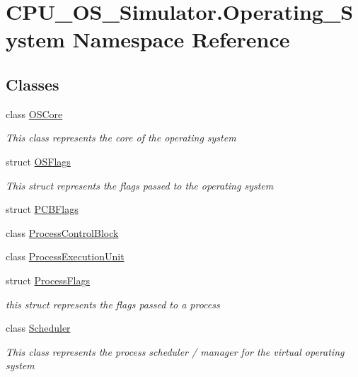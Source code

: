 \hypertarget{namespace_c_p_u___o_s___simulator_1_1_operating___system}{}\section{C\+P\+U\+\_\+\+O\+S\+\_\+\+Simulator.\+Operating\+\_\+\+System Namespace Reference}
\label{namespace_c_p_u___o_s___simulator_1_1_operating___system}
\subsection*{Classes}
\begin{DoxyCompactItemize}
\item 
class \hyperlink{class_c_p_u___o_s___simulator_1_1_operating___system_1_1_o_s_core}{O\+S\+Core}
\begin{DoxyCompactList}\small\item\em This class represents the core of the operating system \end{DoxyCompactList}\item 
struct \hyperlink{struct_c_p_u___o_s___simulator_1_1_operating___system_1_1_o_s_flags}{O\+S\+Flags}
\begin{DoxyCompactList}\small\item\em This struct represents the flags passed to the operating system \end{DoxyCompactList}\item 
struct \hyperlink{struct_c_p_u___o_s___simulator_1_1_operating___system_1_1_p_c_b_flags}{P\+C\+B\+Flags}
\item 
class \hyperlink{class_c_p_u___o_s___simulator_1_1_operating___system_1_1_process_control_block}{Process\+Control\+Block}
\item 
class \hyperlink{class_c_p_u___o_s___simulator_1_1_operating___system_1_1_process_execution_unit}{Process\+Execution\+Unit}
\item 
struct \hyperlink{struct_c_p_u___o_s___simulator_1_1_operating___system_1_1_process_flags}{Process\+Flags}
\begin{DoxyCompactList}\small\item\em this struct represents the flags passed to a process \end{DoxyCompactList}\item 
class \hyperlink{class_c_p_u___o_s___simulator_1_1_operating___system_1_1_scheduler}{Scheduler}
\begin{DoxyCompactList}\small\item\em This class represents the process scheduler / manager for the virtual operating system \end{DoxyCompactList}\item 

\end{DoxyCompactItemize}
